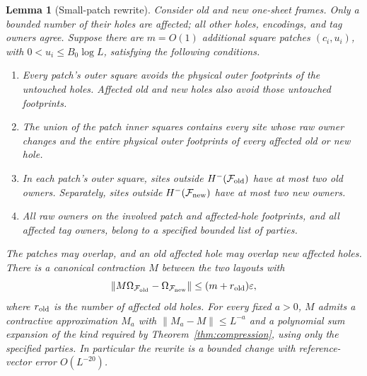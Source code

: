 \documentclass[11pt]{article}
\numberwithin{equation}{section}
\newtheorem{lemma}[theorem]{Lemma}
\theoremstyle{definition}
\theoremstyle{remark}
\begin{document}
\begin{lemma}[Small-patch rewrite]\label{lem:small-rewrite}
Consider old and new one-sheet frames.  Only a bounded number of their holes
are affected; all other holes, encodings, and tag owners agree.  Suppose
there are $m=O(1)$ additional square patches $(c_i,u_i)$, with
$0<u_i\le B_0\log L$, satisfying the following conditions.
\begin{enumerate}
\item Every patch's outer square avoids the physical outer footprints of
the untouched holes.  Affected old and new holes also avoid those
untouched footprints.
\item The union of the patch inner squares contains every site whose raw
owner changes and the entire physical outer footprints of every affected
old or new hole.
\item In each patch's outer square, sites outside $H^-(\mathcal F_{\rm old})$
have at most two old owners.  Separately, sites outside
$H^-(\mathcal F_{\rm new})$ have at most two new owners.
\item All raw owners on the involved patch and affected-hole footprints,
and all affected tag owners, belong to a specified bounded list of parties.
\end{enumerate}
The patches may overlap, and an old affected hole may overlap new affected
holes.  There is a canonical contraction $M$ between the two layouts with
\begin{equation}\label{eq:rewrite-reference-error}
 \lVert M\Omega_{\mathcal F_{\rm old}}-
                   \Omega_{\mathcal F_{\rm new}}\rVert
       \le(m+r_{\rm old})\varepsilon,
\end{equation}
where $r_{\rm old}$ is the number of affected old holes.  For every fixed
$a>0$, $M$ admits a contractive approximation $M_a$ with
$\lVert M_a-M\rVert\le L^{-a}$ and a polynomial sum expansion of the kind required
by Theorem~\ref{thm:compression}, using only the specified parties.  In
particular the rewrite is a bounded change with reference-vector error
$O(L^{-20})$.
\end{lemma}
\end{document}
